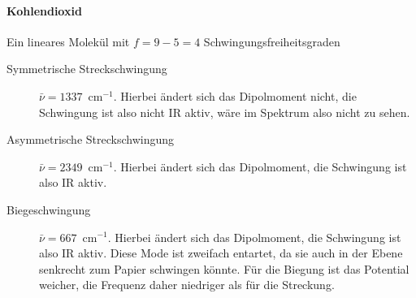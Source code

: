 \paragraph{Kohlendioxid} Ein lineares Molekül mit $f=9 - 5 = 4$ Schwingungsfreiheitsgraden
\begin{description}
\item[Symmetrische Streckschwingung]
  $\bar{\nu} = 1337$~cm$^{-1}$. Hierbei ändert sich das Dipolmoment nicht, die Schwingung ist also nicht IR aktiv, wäre im Spektrum also nicht zu sehen.
\begin{marginfigure}
\end{marginfigure}


\item[Asymmetrische Streckschwingung]
 $\bar{\nu} = 2349$~cm$^{-1}$. Hierbei ändert sich das Dipolmoment, die Schwingung ist also  IR aktiv.
\begin{marginfigure}
\end{marginfigure}

\item[Biegeschwingung] %
 $\bar{\nu} = 667$~cm$^{-1}$. Hierbei ändert sich das Dipolmoment, die Schwingung ist also  IR aktiv. Diese Mode ist zweifach entartet, da sie auch in der Ebene senkrecht zum Papier schwingen könnte. Für die Biegung ist das Potential weicher, die Frequenz daher niedriger als für die Streckung.
\begin{marginfigure}
\end{marginfigure}
\end{description}
